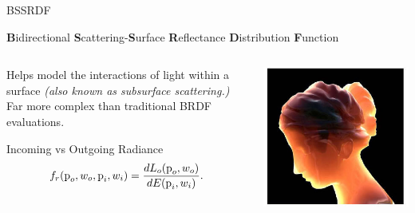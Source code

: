 \documentclass[10pt,compress,professionalfont]{beamer}
\begin{document}
\begin{frame}{BSSRDF}
    
    {\centering
        {\bf B}idirectional {\bf S}cattering-{\bf S}urface {\bf R}eflectance {\bf D}istribution {\bf F}unction
    }
    \vspace{4mm}
    \begin{columns}
        \begin{column}{0.6\textwidth}

            Helps model the interactions of light within a surface \textit{(also known as subsurface scattering.)}\\
            \vspace{8mm}
            Far more complex than traditional BRDF evaluations.\\

            \begin{block}{Incoming vs Outgoing Radiance}
            \[
                f_r(\textup{p}_o, w_o, \textup{p}_i, w_i) =  \frac{dL_o(\textup{p}_o,w_o)}{dE(\textup{p}_i,w_i)}.
            \]
            \end{block}

        \end{column}
        \begin{column}{0.4\textwidth}
            \vspace{10mm}
            \includegraphics[width=\textwidth]{../img/external/subscat}\\
        \end{column}
    \end{columns}

\end{frame}
\end{document}
